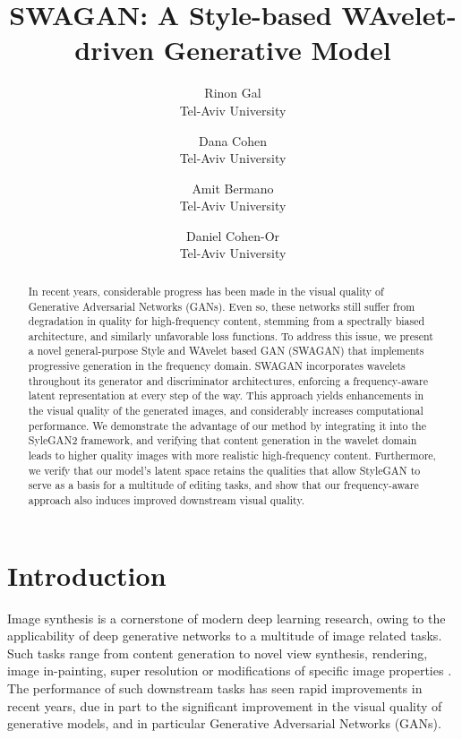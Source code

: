 \documentclass[final]{CVPR2021/cvpr}
\title{SWAGAN: A Style-based WAvelet-driven Generative Model}
\author{Rinon Gal\\
Tel-Aviv University
\and
Dana Cohen\\
Tel-Aviv University
\and
Amit Bermano\\
Tel-Aviv University
\and
Daniel Cohen-Or\\
Tel-Aviv University
}
\begin{document}
\maketitle
\begin{abstract}

In recent years, considerable progress has been made in the visual quality of Generative Adversarial Networks (GANs). Even so, these networks still suffer from degradation in quality for high-frequency content, stemming from a spectrally biased architecture, and similarly unfavorable loss functions. To address this issue, we present a novel general-purpose Style and WAvelet based GAN (SWAGAN) that implements progressive generation in the frequency domain. SWAGAN incorporates wavelets throughout its generator and discriminator architectures, enforcing a frequency-aware latent representation at every step of the way. This approach yields enhancements in the visual quality of the generated images, and considerably increases computational performance. We demonstrate the advantage of our method by integrating it into the SyleGAN2 framework, and verifying that content generation in the wavelet domain leads to higher quality images with more realistic high-frequency content. 
Furthermore, we verify that our model's latent space retains the qualities that allow StyleGAN to serve as a basis for a multitude of editing tasks, and show that our frequency-aware approach also induces improved downstream visual quality.

\end{abstract}
 
\section{Introduction}
\label{sec:intro}



Image synthesis is a cornerstone of modern deep learning research, owing to the applicability of deep generative networks to a multitude of image related tasks. Such tasks range from content generation to novel view synthesis, rendering, image in-painting, super resolution or modifications of specific image properties \citep{thies2019deferred,ledig2017photo,karras_style-based_2019,nguyen2019hologan}. The performance of such downstream tasks has seen rapid improvements in recent years, due in part to the significant improvement in the visual quality of generative models, and in particular Generative Adversarial Networks (GANs).
\end{document}
